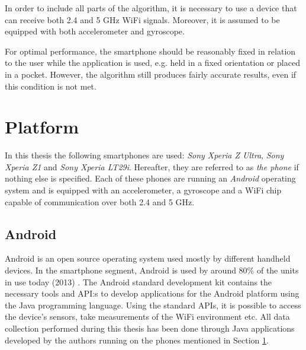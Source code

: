 \documentclass{LTHthesis}
\begin{document}
In order to include all parts of the algorithm, it is necessary to use a device that can receive both 2.4 and 5 GHz WiFi signals. Moreover, it is assumed to be equipped with both accelerometer and gyroscope.

For optimal performance, the smartphone should be reasonably fixed in relation to the user while the application is used, e.g. held in a fixed orientation or placed in a pocket. However, the algorithm still produces fairly accurate results, even if this condition is not met. 

%
\section{Platform}
\label{sec:platform}
%
In this thesis the following smartphones are used: \emph{Sony Xperia Z Ultra}, \emph{Sony Xperia Z1} and \emph{Sony Xperia LT29i}. Hereafter, they are referred to as \emph{the phone} if nothing else is specified. Each of these phones are running an \emph{Android} operating system and is equipped with an accelerometer, a gyroscope and a WiFi chip capable of communication over both 2.4 and 5 GHz.
%
\subsection{Android} 
%
Android is an open source operating system used mostly by different handheld devices. In the smartphone segment, Android is used by around 80\% of the units in use today (2013) \cite{android}. The Android standard development kit contains the necessary tools and API:s to develop applications for the Android platform using the Java programming language. Using the standard APIs, it is possible to access the device's sensors, take measurements of the WiFi environment etc. All data collection performed during this thesis has been done through Java applications developed by the authors running on the phones mentioned in Section \ref{sec:platform}. 
%
\end{document}
